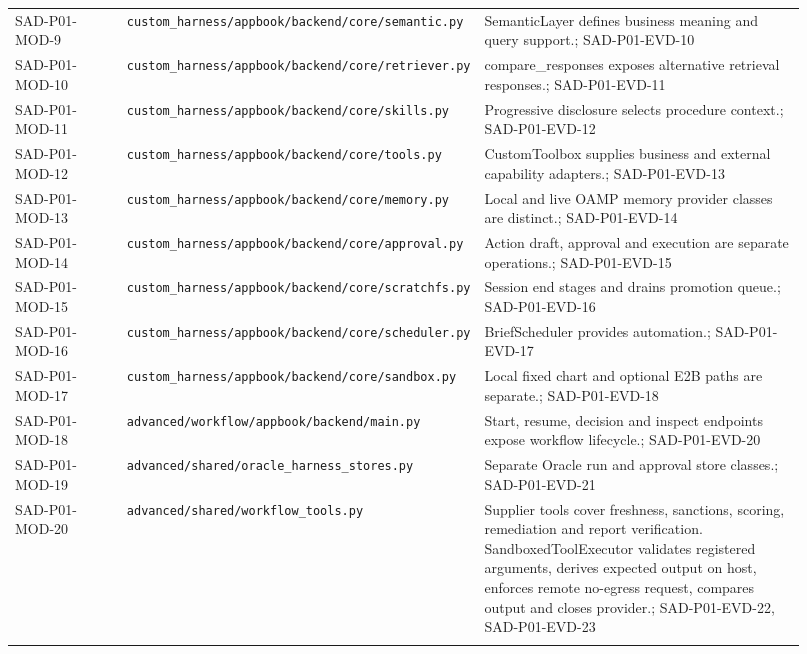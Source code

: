\documentclass[10pt,letterpaper]{article}
\begin{document}
\begin{longtable}{@{}>{\raggedright\arraybackslash}p{0.15\linewidth}>{\raggedright\arraybackslash}p{0.34\linewidth}>{\raggedright\arraybackslash}p{0.43\linewidth}@{}}
SAD-P01-MOD-9 & \nolinkurl{custom_harness/appbook/backend/core/semantic.py} & SemanticLayer defines business meaning and query support.; SAD-P01-EVD-10\\\addlinespace
SAD-P01-MOD-10 & \nolinkurl{custom_harness/appbook/backend/core/retriever.py} & compare\_responses exposes alternative retrieval responses.; SAD-P01-EVD-11\\\addlinespace
SAD-P01-MOD-11 & \nolinkurl{custom_harness/appbook/backend/core/skills.py} & Progressive disclosure selects procedure context.; SAD-P01-EVD-12\\\addlinespace
SAD-P01-MOD-12 & \nolinkurl{custom_harness/appbook/backend/core/tools.py} & CustomToolbox supplies business and external capability adapters.; SAD-P01-EVD-13\\\addlinespace
SAD-P01-MOD-13 & \nolinkurl{custom_harness/appbook/backend/core/memory.py} & Local and live OAMP memory provider classes are distinct.; SAD-P01-EVD-14\\\addlinespace
SAD-P01-MOD-14 & \nolinkurl{custom_harness/appbook/backend/core/approval.py} & Action draft, approval and execution are separate operations.; SAD-P01-EVD-15\\\addlinespace
SAD-P01-MOD-15 & \nolinkurl{custom_harness/appbook/backend/core/scratchfs.py} & Session end stages and drains promotion queue.; SAD-P01-EVD-16\\\addlinespace
SAD-P01-MOD-16 & \nolinkurl{custom_harness/appbook/backend/core/scheduler.py} & BriefScheduler provides automation.; SAD-P01-EVD-17\\\addlinespace
SAD-P01-MOD-17 & \nolinkurl{custom_harness/appbook/backend/core/sandbox.py} & Local fixed chart and optional E2B paths are separate.; SAD-P01-EVD-18\\\addlinespace
SAD-P01-MOD-18 & \nolinkurl{advanced/workflow/appbook/backend/main.py} & Start, resume, decision and inspect endpoints expose workflow lifecycle.; SAD-P01-EVD-20\\\addlinespace
SAD-P01-MOD-19 & \nolinkurl{advanced/shared/oracle_harness_stores.py} & Separate Oracle run and approval store classes.; SAD-P01-EVD-21\\\addlinespace
SAD-P01-MOD-20 & \nolinkurl{advanced/shared/workflow_tools.py} & Supplier tools cover freshness, sanctions, scoring, remediation and report verification. SandboxedToolExecutor validates registered arguments, derives expected output on host, enforces remote no-egress request, compares output and closes provider.; SAD-P01-EVD-22, SAD-P01-EVD-23\\\addlinespace

\end{longtable}
\end{document}
